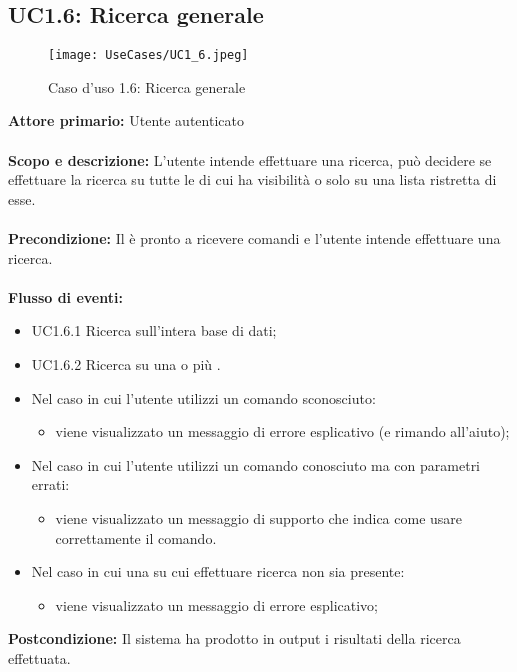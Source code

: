 \documentclass{scalatekids-article}
\begin{document}
\subsection{UC1.6: Ricerca generale}
\begin{figure}[H]
  \begin{center}
    \texttt{[image: UseCases/UC1\_6.jpeg]}
    \caption{Caso d'uso 1.6: Ricerca generale}
  \end{center}
\end{figure}
\textbf{Attore primario:} Utente autenticato \\ \\
\textbf{Scopo e descrizione:} L’utente intende effettuare una ricerca, può decidere se effettuare la ricerca su tutte le  di cui ha visibilità o solo su una lista ristretta di esse.\\ \\
\textbf{Precondizione:} Il  è pronto a ricevere comandi e l’utente intende effettuare una ricerca.\\ \\
\textbf{Flusso di eventi:}
\begin{itemize}
\item UC1.6.1 Ricerca sull'intera base di dati;
\item UC1.6.2 Ricerca su una o più .
\end{itemize}
\begin{itemize}
\item Nel caso in cui l'utente utilizzi un comando sconosciuto:
  \begin{itemize}
  \item viene visualizzato un messaggio di errore esplicativo (e rimando all'aiuto);
  \end{itemize}
\item Nel caso in cui l'utente utilizzi un comando conosciuto ma con parametri errati:
  \begin{itemize}
  \item viene visualizzato un messaggio di supporto che indica come usare correttamente il comando.
  \end{itemize}
\item Nel caso in cui una  su cui effettuare ricerca non sia presente:
  \begin{itemize}
  \item viene visualizzato un messaggio di errore esplicativo;
  \end{itemize}
\end{itemize}
\textbf{Postcondizione:} Il sistema ha prodotto in output i risultati della ricerca effettuata.
\end{document}
